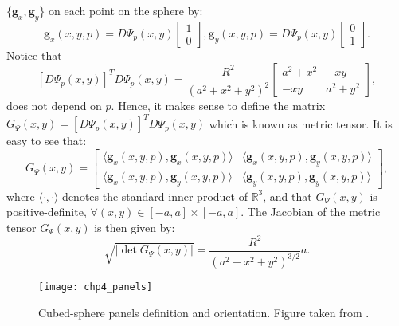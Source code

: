 $\{ \boldsymbol{g}_{x}, \boldsymbol{g}_{y} \}$ on each point on the sphere by:
\begin{equation*}
	\boldsymbol{g}_{x}(x,y,p) = D\Psi_{p}(x,y)
	\begin{bmatrix}
		 1 \\
		 0
	\end{bmatrix},
	\boldsymbol{g}_{y}(x,y,p) = D\Psi_{p}(x,y)
	\begin{bmatrix}
		 0 \\
		 1
	\end{bmatrix}.
\end{equation*}
Notice that
\begin{equation*}
	\label{chp3-eqdistant-psitensor}
	[D\Psi_{p}(x,y)]^TD\Psi_{p}(x,y)
	= \frac{R^2}{(a^2 + x^2 + y^2)^2}
	\begin{bmatrix}
		 a^2 + x^2 &  -xy \\
		 -xy & a^2 + y^2
	\end{bmatrix},
\end{equation*}
does not depend on $p$.
Hence, it makes sense to define the matrix 
$G_{\Psi}(x,y) = [D\Psi_{p}(x,y)]^TD\Psi_{p}(x,y)$ 
which is known as metric tensor.
It is easy to see that:
\begin{equation*}
	\label{chp3-eqdistant-psi-metric-tensor}
	G_{\Psi}(x,y) = 
	\begin{bmatrix}
		\langle \boldsymbol{g}_{x}(x,y,p), \boldsymbol{g}_{x}(x,y,p) \rangle & 
		\langle \boldsymbol{g}_{x}(x,y,p), \boldsymbol{g}_{y}(x,y,p) \rangle \\
		\langle \boldsymbol{g}_{x}(x,y,p), \boldsymbol{g}_{y}(x,y,p) \rangle  &
		\langle \boldsymbol{g}_{y}(x,y,p), \boldsymbol{g}_{y}(x,y,p) \rangle 
	\end{bmatrix},
\end{equation*}
where $\langle \cdot, \cdot \rangle$ denotes 
the standard inner product of $\mathbb{R}^3$,
and that $G_{\Psi}(x,y)$ is positive-definite, 
$\forall (x,y) \in [-a,a]\times[-a,a]$.
The Jacobian of the metric tensor $G_{\Psi}(x,y)$ is then given by:
\begin{equation*}
	\sqrt{|\det{G_{\Psi}(x,y)}|} = \frac{R^2}{(a^2+x^2+y^2)^{3/2}}a.
\end{equation*}
\begin{figure}[!htb]
	\centering
		\texttt{[image: chp4\_panels]}
	\caption{Cubed-sphere panels definition and orientation.
    Figure taken from \citet{jung:2019}.\label{chp4-panels}}
\end{figure}


